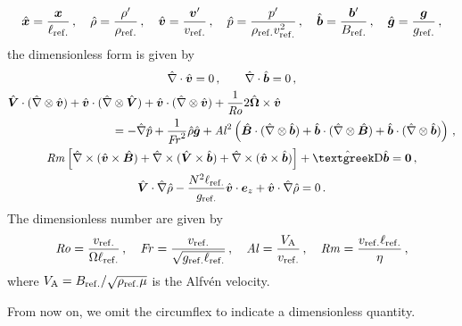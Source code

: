 \begin{equation}
	\hat{\bm{x}}=\frac{\bm{x}}{\ell_{\mathrm{ref.}}}\,,\quad
	\hat{\rho}=\frac{\rho'}{\rho_{\mathrm{ref.}}}\,,\quad
	\hat{\bm{v}}=\frac{\bm{v}'}{v_{\mathrm{ref.}}}\,,\quad 
	\hat{p}=\frac{p'}{\rho_{\mathrm{ref.}}v_{\mathrm{ref.}}^2}\,,\quad
	\hat{\bm{b}}=\frac{\bm{b}'}{B_{\mathrm{ref.}}}\,,\quad
	\hat{\bm{g}}=\frac{\bm{g}}{g_{\mathrm{ref.}}}\,,
\end{equation}
the dimensionless form is given by
\begin{subequations}
\begin{gather}
	\hat{\nabla}\cdot\hat{\bm{v}}=0\,,\qquad \hat{\nabla}\cdot\hat{\bm{b}}=0\,,\\
	\begin{multlined}
	\hat{\bm{V}}\cdot(\hat{\nabla}\otimes\hat{\bm{v}})+\hat{\bm{v}}\cdot(\hat{\nabla}\otimes\hat{\bm{V}})+\hat {\bm{v}}\cdot(\hat{\nabla}\otimes\hat{\bm{v}})+\frac{1}{\Rossby} 2\hat{\bm{\Omega}}\times\hat{\bm{v}}\\
	\hspace{2.75cm}=-\hat{\nabla} \hat{p}+\frac{1}{\Froude^2}\hat{\rho}\hat{\bm{g}}+\Alfven^2\left(\hat{\bm{B}}\cdot(\hat{\nabla}\otimes\hat{\bm{b}})+\hat{\bm{b}}\cdot(\hat{\nabla}\otimes\hat{\bm{B}})+\hat{\bm{b}}\cdot(\hat{\nabla}\otimes\hat{\bm{b}})\right)\,,
	\end{multlined}\\
	\MagneticReynolds\left[\hat{\nabla}\times(\hat{\bm{v}}\times\hat{\bm{B}})+\hat{\nabla}\times(\hat{\bm{V}}\times\hat{\bm{b}})+\hat{\nabla}\times(\hat{\bm{v}}\times\hat{\bm{b}})\right]+\hat{\laplace}\hat{\bm{b}}=\bm{0}\,,\\
	\hat{\bm{V}}\cdot\hat{\nabla}\hat{\rho}-\frac{N^2\lref}{\gref}\hat{\bm{v}}\cdot\bm{e}_z+\hat{\bm{v}}\cdot\hat{\nabla}\hat{\rho}=0\,.
\end{gather}
\end{subequations}
The dimensionless number are given by
\begin{equation}
	\mathit{Ro}=\frac{v_{\mathrm{ref.}}}{\Omega\ell_{\mathrm{ref.}}}\,,\quad
	\mathit{Fr}=\frac{v_{\mathrm{ref.}}}{\sqrt{g_{\mathrm{ref.}}\ell_{\mathrm{ref.}}}}\,,\quad
	\mathit{Al}=\frac{V_\mathrm{A}}{v_{\mathrm{ref.}}}\,,\quad 
	\mathit{Rm}=\frac{v_{\mathrm{ref.}}\ell_{\mathrm{ref.}}}{\eta}\,,
\end{equation}
where $V_\mathrm{A}=B_{\mathrm{ref.}}/\sqrt{\rho_{\mathrm{ref.}}\mu}$ is the Alfv\'en velocity.

From now on, we omit the circumflex to indicate a dimensionless quantity.

